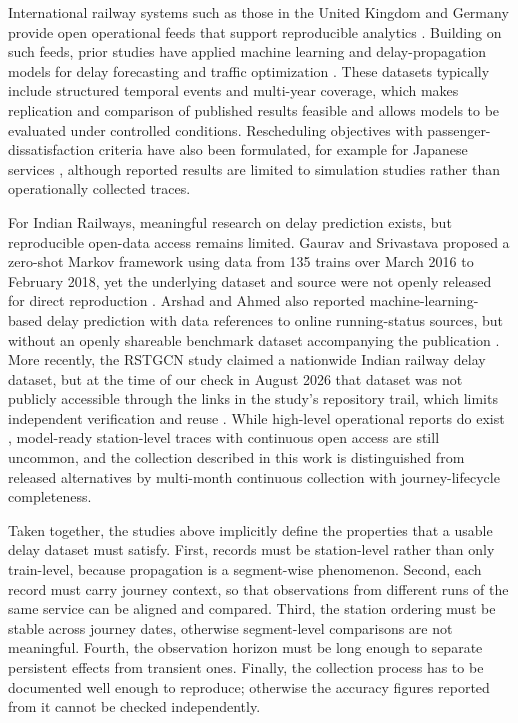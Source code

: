 \documentclass[a4paper,fleqn]{cas-dc}
\begin{document}
International railway systems such as those in the United Kingdom and
Germany provide open operational feeds that support reproducible analytics
\citep{uk_rail_data,german_rail_data}. Building on such feeds, prior studies
have applied machine learning and delay-propagation models for delay
forecasting and traffic optimization
\citep{oneto2018train,flier2009delay,goverde2010railway}. These datasets
typically include structured temporal events and multi-year coverage, which
makes replication and comparison of published results feasible and allows
models to be evaluated under controlled conditions. Rescheduling objectives with
passenger-dissatisfaction criteria have also been formulated, for example for
Japanese services \citep{tomii2005train}, although reported results are limited to
simulation studies rather than operationally collected traces.

For Indian Railways, meaningful research on delay prediction exists, but
reproducible open-data access remains limited. Gaurav and Srivastava proposed
a zero-shot Markov framework using data from 135 trains over March 2016 to
February 2018, yet the underlying dataset and source were not openly released
for direct reproduction \citep{gaurav2018zeroshot}. Arshad and Ahmed also
reported machine-learning-based delay prediction with data references to
online running-status sources, but without an openly shareable benchmark
dataset accompanying the publication \citep{arshad2019prediction}. More
recently, the RSTGCN study claimed a nationwide Indian railway delay dataset,
but at the time of our check in August 2026 that dataset was not publicly
accessible through the links in the study's repository trail, which limits
independent verification and reuse \citep{chowdhury2025rstgcn}. While high-level
operational reports do exist \citep{indian_railways_stats}, model-ready
station-level traces with continuous open access are still uncommon, and the
collection described in this work is distinguished from released alternatives
by multi-month continuous collection with journey-lifecycle completeness.

Taken together, the studies above implicitly define the properties that a
usable delay dataset must satisfy. First, records must be station-level
rather than only train-level, because propagation is a segment-wise
phenomenon. Second, each record must carry journey context, so that
observations from different runs of the same service can be aligned and
compared. Third, the station ordering must be stable across journey dates,
otherwise segment-level comparisons are not meaningful. Fourth, the
observation horizon must be long enough to separate persistent effects from
transient ones. Finally, the collection process has to be documented well
enough to reproduce; otherwise the accuracy figures reported from it cannot
be checked independently.
\end{document}
